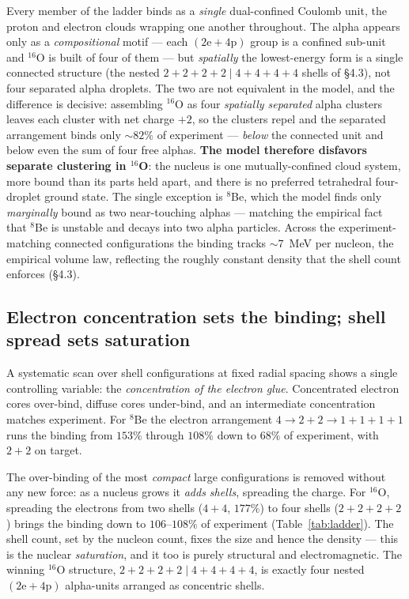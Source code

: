 \documentclass[11pt]{article}
\begin{document}
Every member of the ladder binds as a \emph{single} dual-confined Coulomb unit, the proton and
electron clouds wrapping one another throughout. The alpha appears only as a \emph{compositional}
motif --- each $(\mathrm{2e}+\mathrm{4p})$ group is a confined sub-unit and $^{16}$O is built of
four of them --- but \emph{spatially} the lowest-energy form is a single connected structure
(the nested $2{+}2{+}2{+}2\mid 4{+}4{+}4{+}4$ shells of \S4.3), not four separated alpha
droplets. The two are not equivalent in the model, and the difference is decisive: assembling
$^{16}$O as four \emph{spatially separated} alpha clusters leaves each cluster with net charge
$+2$, so the clusters repel and the separated arrangement binds only ${\sim}82\%$ of experiment
--- \emph{below} the connected unit and below even the sum of four free alphas. \textbf{The model
therefore disfavors separate clustering in $^{16}$O}: the nucleus is one mutually-confined cloud
system, more bound than its parts held apart, and there is no preferred tetrahedral four-droplet
ground state. The single exception is $^8$Be, which the model finds only \emph{marginally} bound
as two near-touching alphas --- matching the empirical fact that $^8$Be is unstable and decays
into two alpha particles. Across the experiment-matching connected configurations the binding
tracks ${\sim}7$~MeV per nucleon, the empirical volume law, reflecting the roughly constant
density that the shell count enforces (\S4.3).

\subsection{Electron concentration sets the binding; shell spread sets saturation}

A systematic scan over shell configurations at fixed radial spacing shows a single controlling
variable: the \emph{concentration of the electron glue}. Concentrated electron cores over-bind,
diffuse cores under-bind, and an intermediate concentration matches experiment. For $^8$Be the
electron arrangement $4\to 2{+}2\to 1{+}1{+}1{+}1$ runs the binding from $153\%$ through $108\%$
down to $68\%$ of experiment, with $2{+}2$ on target.

The over-binding of the most \emph{compact} large configurations is removed without any new
force: as a nucleus grows it \emph{adds shells}, spreading the charge. For $^{16}$O, spreading
the electrons from two shells ($4{+}4$, $177\%$) to four shells ($2{+}2{+}2{+}2$) brings the
binding down to $106$--$108\%$ of experiment (Table~\ref{tab:ladder}). The shell count, set by
the nucleon count, fixes the size and hence the density --- this is the nuclear
\emph{saturation}, and it too is purely structural and electromagnetic. The winning
$^{16}$O structure, $2{+}2{+}2{+}2\mid 4{+}4{+}4{+}4$, is exactly four nested
$(\mathrm{2e}+\mathrm{4p})$ alpha-units arranged as concentric shells.
\end{document}
